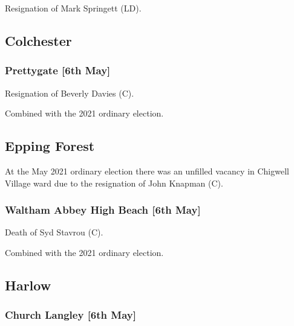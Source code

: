 \documentclass[a4paper,openany]{book}
\begin{document}
\begin{resultsiii}

Resignation of Mark Springett (LD).

\subsection*{Colchester}

\subsubsection*{Prettygate \hspace*{\fill}\nolinebreak[1]%
	\enspace\hspace*{\fill}
	[6th May]}


Resignation of Beverly Davies (C).

Combined with the 2021 ordinary election.

\subsection*{Epping Forest}

At the May 2021 ordinary election there was an unfilled vacancy in Chigwell Village ward due to the resignation of John Knapman (C).

\subsubsection*{Waltham Abbey High Beach \hspace*{\fill}\nolinebreak[1]%
	\enspace\hspace*{\fill}
	[6th May]}


Death of Syd Stavrou (C).

Combined with the 2021 ordinary election.

\subsection*{Harlow}

\subsubsection*{Church Langley \hspace*{\fill}\nolinebreak[1]%
	\enspace\hspace*{\fill}
	[6th May]}


\end{resultsiii}
\end{document}
